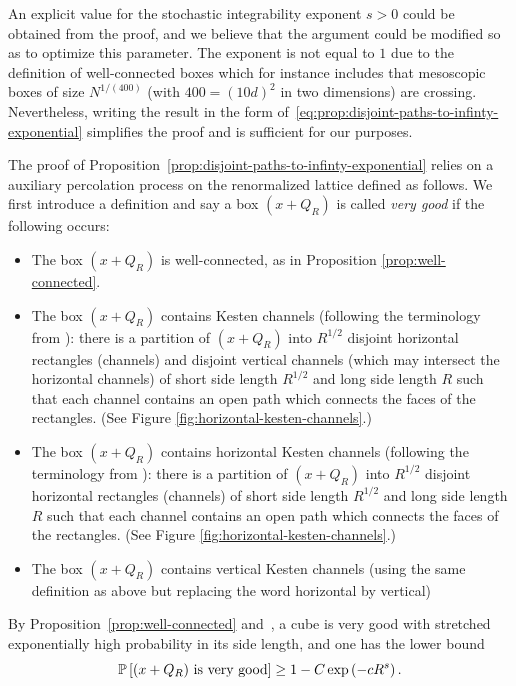 \documentclass[12pt]{amsart}
\numberwithin{equation}{section}
\begin{document}
	\begin{remark}
		An explicit value for the stochastic integrability exponent $s > 0$ could be obtained from the proof, and we believe that the argument could be modified so as to optimize this parameter. The exponent is not equal to $1$ due to the definition of well-connected boxes which for instance includes that mesoscopic boxes of size $N^{1/(400)}$ (with $400 = (10 d)^2$ in two dimensions) are crossing. Nevertheless, writing the result in the form of~\eqref{eq:prop:disjoint-paths-to-infinty-exponential} simplifies the proof and is sufficient for our purposes.
	\end{remark}
	
	
	The proof of Proposition~\ref{prop:disjoint-paths-to-infinty-exponential} relies on a auxiliary percolation process on the renormalized lattice defined as follows. 
	We first introduce a definition and say a box $(x + Q_R)$ is called {\it very good} if the following occurs:
	\begin{itemize}        
		\item The box $(x + Q_R)$ is well-connected, as in Proposition \ref{prop:well-connected}.
		\item The box $(x + Q_R)$ contains Kesten channels (following the terminology from \cite{isoperimetry-mathieu-remy}): there is a partition of $(x  + Q_R)$ into $R^{1/2}$ disjoint horizontal rectangles (channels) and disjoint vertical channels (which may intersect the horizontal channels) of short side length $R^{1/2}$ and long side length $R$ such that each channel contains an open path which connects the faces of the rectangles. (See Figure \ref{fig:horizontal-kesten-channels}.)
		\item The box $(x + Q_R)$ contains horizontal Kesten channels (following the terminology from \cite{isoperimetry-mathieu-remy}): there is a partition of $(x  + Q_R)$ into $R^{1/2}$ disjoint horizontal rectangles (channels) of short side length $R^{1/2}$ and long side length $R$ such that each channel contains an open path which connects the faces of the rectangles. (See Figure \ref{fig:horizontal-kesten-channels}.)
		\item The box $(x + Q_R)$ contains vertical Kesten channels (using the same definition as above but replacing the word horizontal by vertical)
	\end{itemize}
	By Proposition~\ref{prop:well-connected} and~\cite[Theorem 11.1]{kesten-book}, a cube is very good with stretched exponentially high probability in its side length, and one has the lower bound
	\begin{equation} \label{eq:verygoodstretchedexpclose1}
		\P \left[ (x + Q_R) \mbox{ is very good} \right] \geq 1 - C \exp \left( - c R^{s} \right).
	\end{equation}
	
\end{document}
